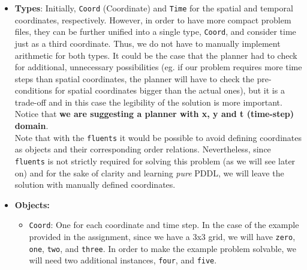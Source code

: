 \documentclass{article}
\begin{document}
\begin{enumerate}
\begin{itemize}
    \item \textbf{Types}: Initially, \texttt{Coord} (Coordinate) and \texttt{Time} for the spatial and temporal coordinates, respectively. However, in order to have more compact problem files, they can be further unified into a single type, \texttt{Coord}, and consider time just as a third coordinate. Thus, we do not have to manually implement arithmetic for both types. It could be the case that the planner had to check for additional, unnecessary possibilities (eg. if our problem requires more time steps than spatial coordinates, the planner will have to check the pre-conditions for spatial coordinates bigger than the actual ones), but it is a trade-off and in this case the legibility of the solution is more important.\\Notice that \textbf{we are suggesting a planner with x, y and t (time-step) domain}.\\ Note that with the \texttt{fluents} it would be possible to avoid defining coordinates as objects and their corresponding order relations. Nevertheless, since \texttt{fluents} is not strictly required for solving this problem (as we will see later on) and for the sake of clarity and learning \textit{pure} PDDL, we will leave the solution with manually defined coordinates.
    \item \textbf{Objects:} \begin{itemize}
        \item \texttt{Coord}: One for each coordinate and time step. In the case of the example provided in the assignment, since we have a 3x3 grid, we will have \texttt{zero}, \texttt{one}, \texttt{two}, and \texttt{three}. In order to make the example problem solvable, we will need two additional instances, \texttt{four}, and \texttt{five}.
    \end{itemize}

\end{itemize}
\end{enumerate}
\end{document}
